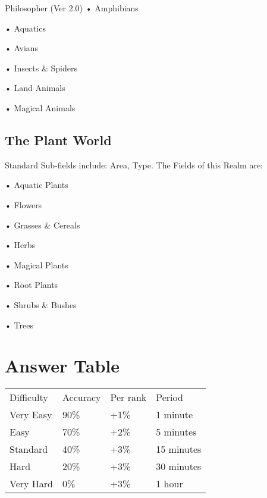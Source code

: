 \begin{Chapter}{Philosopher (Ver 2.0)}
• Amphibians  

• Aquatics  

• Avians  

• Insects \& Spiders  

• Land Animals  

• Magical Animals 

\subsection{The Plant World}

Standard Sub-fields include: Area, Type.  The Fields of this Realm
are:

• Aquatic Plants  

• Flowers  

• Grasses \& Cereals  

• Herbs  

• Magical Plants  

• Root Plants  

• Shrubs \& Bushes  

• Trees 


\section{Answer Table}

\begin{tabularx}{\columnwidth}{XXXX} \\
Difficulty	& Accuracy	& Per rank	& Period \\
Very Easy	& 90\%		& +1\%		& 1 minute \\
Easy		& 70\%		& +2\%		& 5 minutes \\
Standard	& 40\%		& +3\%		& 15 minutes \\
Hard		& 20\%		& +3\%		& 30 minutes \\
Very Hard	& 0\%		& +3\%		& 1 hour \\
\end{tabularx}

\end{Chapter}
